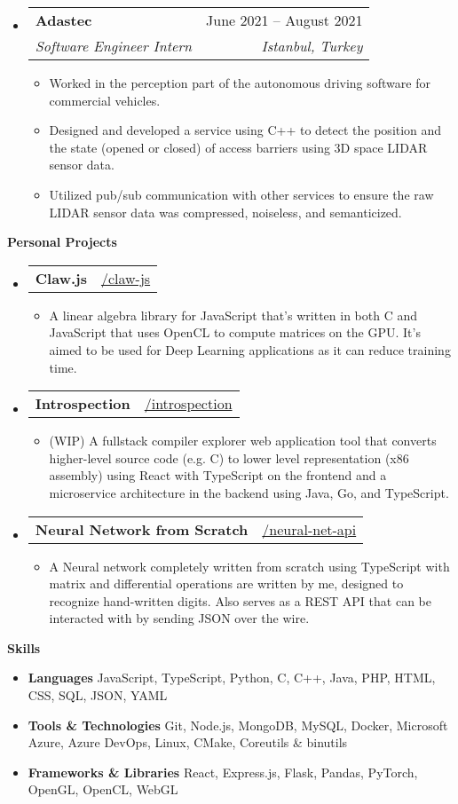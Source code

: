 \documentclass[letterpaper,12pt]{article}[leftmargin=*]
\makeatletter
\def \githubicon {\faGithub}
\def \entryspacing {-0pt}
\renewcommand{\section}[2]{\vspace{5pt}
  \colorbox{secondary}{\color{white}\raggedbottom\normalsize\textbf{{#1}{\hspace{7pt}#2}}}
}
\newcommand{\resumeEntryStart}{\begin{itemize}[leftmargin=2.5mm]}
\newcommand{\resumeEntryEnd}{\end{itemize}\vspace{\entryspacing}}
\newcommand{\resumeItemListStart}{\begin{itemize}[leftmargin=4.5mm]}
\newcommand{\resumeItemListEnd}{\end{itemize}}
\newcommand{\resumeItem}[1]{
  \item\small{
    {#1 \vspace{-2pt}}
  }
}
\newcommand{\resumeEntryTSDL}[4]{
  \vspace{-1pt}\item[]
    \begin{tabularx}{0.97\textwidth}{X@{\hspace{60pt}}r}
      \textbf{\color{primary}#1} & {\firabook\color{accent}\small#2} \\
      \textit{\color{accent}\small#3} & \textit{\color{accent}\small#4} \\
    \end{tabularx}\vspace{-6pt}
}
\newcommand{\resumeEntryTD}[2]{
  \vspace{-1pt}\item[]
    \begin{tabularx}{0.97\textwidth}{X@{\hspace{60pt}}r}
      \textbf{\color{primary}#1} & {\firabook\color{accent}\small#2} \\
    \end{tabularx}\vspace{-6pt}
}
\newcommand{\resumeEntryS}[2]{
  \item[]\small{
    \textbf{\color{primary}#1 }{ #2 \vspace{-6pt}}
  }
}
\makeatother
\begin{document}
  \resumeEntryStart
    \resumeEntryTSDL
      {Adastec}{June 2021 -- August 2021}
      {Software Engineer Intern}{Istanbul, Turkey}
    \resumeItemListStart
      \resumeItem {Worked in the perception part of the autonomous driving software for commercial vehicles.}
      \resumeItem {Designed and developed a service using C++ to detect the position and the state (opened or closed) of access barriers using 3D space LIDAR sensor data.}
      \resumeItem {Utilized pub/sub communication with other services to ensure the raw LIDAR sensor data was compressed, noiseless, and semanticized.}
    \resumeItemListEnd
  \resumeEntryEnd


\section{\faFlask}{Personal Projects}

  \resumeEntryStart
    \resumeEntryTD
      {Claw.js}{\githubicon \href{https://github.com/tussoftwaredesign/claw-js}{ /claw-js}}
    \resumeItemListStart
      \resumeItem {A linear algebra library for JavaScript that's written in both C and JavaScript that uses OpenCL to compute matrices on the GPU. It's aimed to be used for Deep Learning applications as it can reduce training time.}
    \resumeItemListEnd
  \resumeEntryEnd

  \resumeEntryStart
    \resumeEntryTD
      {Introspection}{\githubicon \href{https://github.com/yvesyil/introspection}{ /introspection}}
    \resumeItemListStart
      \resumeItem {(WIP) A fullstack compiler explorer web application tool that converts higher-level source code (e.g. C) to lower level representation (x86 assembly) using React with TypeScript on the frontend and a microservice architecture in the backend using Java, Go, and TypeScript.}
    \resumeItemListEnd
  \resumeEntryEnd

  \resumeEntryStart
    \resumeEntryTD
      {Neural Network from Scratch}{\githubicon \href{https://github.com/yvesyil/neural-net-api}{ /neural-net-api}}
    \resumeItemListStart
      \resumeItem {A Neural network completely written from scratch using TypeScript with matrix and differential operations are written by me, designed to recognize hand-written digits. Also serves as a REST API that can be interacted with by sending JSON over the wire.}
    \resumeItemListEnd
  \resumeEntryEnd

\section{\faGears}{Skills}
 \resumeEntryStart
  \resumeEntryS{Languages} {JavaScript, TypeScript, Python, C, C++, Java, PHP, HTML, CSS, SQL, JSON, YAML}
  \resumeEntryS{Tools \& Technologies} {Git, Node.js, MongoDB, MySQL, Docker, Microsoft Azure, Azure DevOps, Linux, CMake, Coreutils \& binutils}
  \resumeEntryS{Frameworks \& Libraries} {React, Express.js, Flask, Pandas, PyTorch, OpenGL, OpenCL, WebGL}
 \resumeEntryEnd
\end{document}
